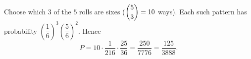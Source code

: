 Choose which $3$ of the $5$ rolls are sixes ($\dbinom53=10$ ways). Each such pattern has probability $\left(\dfrac{1}{6}\right)^3\left(\dfrac{5}{6}\right)^2$. Hence
\[
P=10\cdot\dfrac{1}{216}\cdot\dfrac{25}{36}=\dfrac{250}{7776}=\boxed{\dfrac{125}{3888}}.
\]
